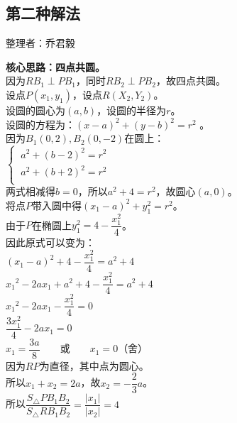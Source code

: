\documentclass[UTF8]{ctexart}
\begin{document}
\subsection{第二种解法}
    \begin{center}
        整理者：乔君毅
    \end{center}
    \begin{multicols}{2}
        \small
        \textbf{核心思路：四点共圆。}\\[5mm]
        因为$RB_{1} \perp PB_{1}$，同时$RB_{2}\perp PB_{2}$，故四点共圆。\\[5mm]
        设点$P(x_{1},y_{1})$，设点$R(X_{2},Y_{2})$。\\[5mm]
        设圆的圆心为$(a,b)$，设圆的半径为$r$。\\[5mm]
        设圆的方程为：$(x-a)^{2}+(y-b)^{2}= r^{2}$ 。\\[5mm]
        因为$B_{1}(0,2),B_{2}(0,-2)$在圆上：\\[5mm]
        \begin{math}
            \begin{cases}
                ~a^{2}+(b-2)^{2}= r^{2}\\[1mm]
                ~a^{2}+(b+2)^{2}= r^{2}\\[1mm]
            \end{cases}
        \end{math}\\[5mm]
        两式相减得$b=0$，所以$a^{2}+4= r^{2}$，故圆心$(a,0)$。\\[5mm]
        将点$P$带入圆中得$(x_{1}-a)^{2}+y_{1}^{2}=r^{2}$。\\[5mm]
        由于$P$在椭圆上$y_1^2=4-\dfrac{x_1^2}{4}$。\\[5mm]
        因此原式可以变为：\\[5mm]
        $(x_{1}-a)^{2}+4-\dfrac{x_{1}^{2} }{4}=a^{2}+4$\\[5mm]
        ${x_{1}}^{2} -2ax_{1}+a^{2} +4-\dfrac{x_{1}^{2} }{4}=a^{2}+4$ \\[5mm]
        ${x_{1}}^{2} -2ax_{1}-\dfrac{x_{1}^{2} }{4}=0$ \\[5mm]
        $\dfrac{3x_1^2}{4}-2ax_1=0$ \\[5mm]
        $x_1=\dfrac{3a}{8}$~~~~或~~~~$x_1=0$（舍）\\[100mm]
        因为$RP$为直径，其中点为圆心。\\[5mm]
        所以$x_{1}+x_{2}=2a$，故$x_2=-\dfrac{2}{3}a$。\\[5mm]
        所以$\dfrac{S_{\triangle}PB_{1}B_{2} }{S_{\triangle}RB_{1}B_{2} } =\dfrac{\left | x_{1} \right | }{\left | x_{2} \right | }=4 $
        \newpage
    \end{multicols}
\end{document}

